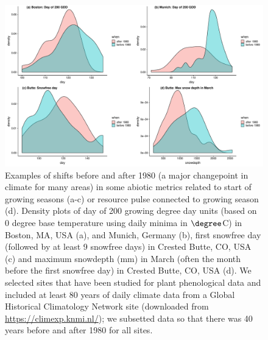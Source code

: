 \documentclass[11pt,letterpaper]{article}
\begin{document}
\clearpage

\begin{figure}[t!]
\centering
\includegraphics[width=1\textwidth]{..//..//R/graphs/otherdat/climdata.pdf}
\caption{Examples of shifts before and after 1980 (a major changepoint in climate for many areas) in some abiotic metrics related to start of growing seasons (a-c) or resource pulse connected to growing season (d). Density plots of day of 200 growing degree day units (based on 0 degree base temperature using daily minima in $\degree$C) in Boston, MA, USA (a), and Munich, Germany (b), first snowfree day (followed by at least 9 snowfree days) in Crested Butte, CO, USA (c) and maximum snowdepth (mm) in March (often the month before the first snowfree day) in Crested Butte, CO, USA (d). We selected sites that have been studied for plant phenological data and included at least 80 years of daily climate data from a Global Historical Climatology Network site (downloaded from \url{https://climexp.knmi.nl/}); we subsetted data so that there was 40 years before and after 1980 for all sites.}
  \label{fig:climdat}
\end{figure}
\end{document}
